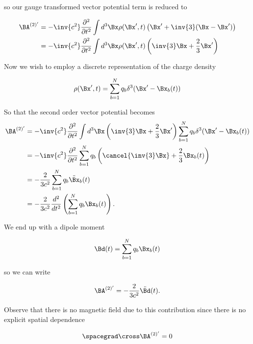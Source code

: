 so our gauge transformed vector potential term is reduced to

\begin{align*}
\BA^{(2)'} 
&= 
-\inv{c^2} \frac{\partial^2}{\partial t^2} \int d^3 \Bx \rho(\Bx', t) \left(\Bx' + \inv{3}(\Bx - \Bx') \right) \\
&= 
-\inv{c^2} \frac{\partial^2}{\partial t^2} \int d^3 \Bx \rho(\Bx', t) \left(\inv{3} \Bx + \frac{2}{3}\Bx' \right) \\
\end{align*}

Now we wish to employ a discrete representation of the charge density

\begin{equation}\label{eqn:relativisticElectrodynamicsL27:90}
\rho(\Bx', t) = \sum_{b=1}^N q_b \delta^3(\Bx' - \Bx_b(t))
\end{equation}

So that the second order vector potential becomes
\begin{align*}
\BA^{(2)'} 
&= 
-\inv{c^2} \frac{\partial^2}{\partial t^2} \int d^3 \Bx \left(\inv{3} \Bx + \frac{2}{3}\Bx' \right) 
\sum_{b=1}^N q_b \delta^3(\Bx' - \Bx_b(t)) \\
&= 
-\inv{c^2} \frac{\partial^2}{\partial t^2} \sum_{b=1}^N q_b \left( \cancel{\inv{3} \Bx} + \frac{2}{3}\Bx_b(t) \right) \\
&=
-\frac{2}{3 c^2} 
\sum_{b=1}^N q_b \ddot{\Bx}_b(t) \\
&=
-\frac{2}{3 c^2} \frac{d^2}{dt^2}
\left( \sum_{b=1}^N q_b \Bx_b(t) \right).
\end{align*}

We end up with a dipole moment

\begin{equation}\label{eqn:relativisticElectrodynamicsL27:110}
\Bd(t) = \sum_{b=1}^N q_b \Bx_b(t) 
\end{equation}

so we can write

\begin{equation}\label{eqn:relativisticElectrodynamicsL27:130}
\BA^{(2)'} = -\frac{2}{3 c^2} \ddot{\Bd}(t).
\end{equation}

Observe that there is no magnetic field due to this contribution since there is no explicit spatial dependence

\begin{equation}\label{eqn:relativisticElectrodynamicsL27:150}
\spacegrad \cross \BA^{(2)'} = 0
\end{equation}

